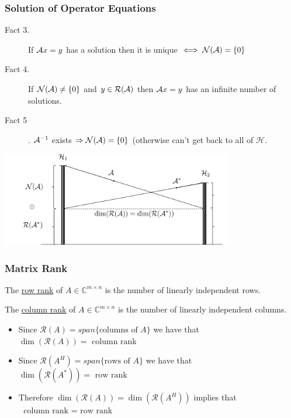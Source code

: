 \documentclass{beamer}
\begin{document}
\begin{frame}\frametitle{Solution of Operator Equations}
	\begin{description}
		\item[Fact 3.] If $\mathcal{A} x = y$ has a solution then it is unique $\iff \mathcal{N}(\mathcal{A}) = \{0\}$
		\item[Fact 4.]  If $\mathcal{N}(\mathcal{A}) \neq \{0\}$ and $y \in \mathcal{R}(\mathcal{A})$ then $\mathcal{A} x = y$ has an infinite number of solutions.
		\item[Fact 5].  $\mathcal{A}^{-1}$ exists $\Rightarrow \mathcal{N}(\mathcal{A}) = \{0\}$ (otherwise can't get back to all of $\mathcal{H}$.
	\end{description}
 
	\begin{center}
		\includegraphics[width=4in]{figures/chap4_fundamental_subspaces}
	\end{center}	
\end{frame}


\begin{frame}\frametitle{Matrix Rank}
	\begin{definition} 
		The \underline{row rank} of $A\in\mathbb{C}^{m\times n}$ is the number of linearly independent rows.
	\end{definition}
	\begin{definition}
		The \underline{column rank} of $A\in\mathbb{C}^{m\times n}$ is the number of linearly independent columns.
	\end{definition}

	\begin{itemize}
		\item Since $\mathcal{R}(A) = span\{\text{columns of } A\}$ we have that $\dim(\mathcal{R}(A)) = \text{ column rank }$
		\item Since $\mathcal{R}(A^H) = span\{\text{rows of } A\}$ we have that $\dim(\mathcal{R}(A^\ast)) = \text{ row rank } $
		\item Therefore $\dim(\mathcal{R}(A)) = \dim(\mathcal{R}(A^H))$ implies that $\text{ column rank } = \text{ row rank }$
	\end{itemize}
\end{frame}
\end{document}
